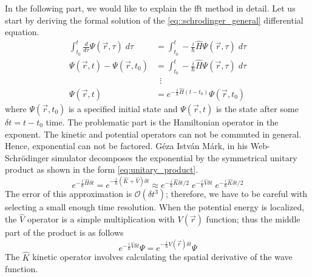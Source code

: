 In the following part, we would like to explain the \acrshort{fft} method in detail.
Let us start by deriving the formal solution of the \ref{eq::schrodinger_general} differential equation.
\begin{equation}
	\label{eq:formal_solution}
	\begin{split}
		\int_{t_0}^t \frac{d}{d\tau}\Psi(\vec{r}, \tau) \; d\tau &= \int_{t_0}^t -\frac{i}{\hbar}\hat{H}\Psi(\vec{r}, \tau)\; d\tau\\
		\Psi(\vec{r}, t) - \Psi(\vec{r}, t_0) &= \int_{t_0}^t -\frac{i}{\hbar}\hat{H}\Psi(\vec{r}, \tau)\; d\tau\\
		&\;\:\vdots\\
		\Psi(\vec{r}, t) &= e^{-\frac{i}{\hbar}\hat{H}(t - t_0)} \Psi(\vec{r}, t_0)
	\end{split}
\end{equation}
where $\Psi(\vec{r}, t_0)$ is a specified initial state and $\Psi(\vec{r}, t)$ is the state after some $\delta t = t - t_0$ time.
The problematic part is the Hamiltonian operator in the exponent.
The kinetic and potential operators can not be commuted in general. Hence, exponential can not be factored.
Géza István Márk, in his Web-Schrödinger simulator \cite{mark2020webschrodinger} decomposes the exponential by the symmetrical unitary product as shown in the form \ref{eq:unitary_product}.
\begin{equation}
	\label{eq:unitary_product}
	e^{-\frac{i}{\hbar}\hat{H}\delta t} = e^{-\frac{i}{\hbar}(\hat{K} + \hat{V})\delta t} \approx e^{-\frac{i}{\hbar}\hat{K}\delta t / 2}\; e^{-\frac{i}{\hbar}\hat{V}\delta t}\; e^{-\frac{i}{\hbar}\hat{K}\delta t / 2}
\end{equation}
The error of this approximation is $\mathcal{O}(\delta t^3)$; therefore, we have to be careful with selecting a small enough time resolution.
When the potential energy is localized, the $\hat{V}$ operator is a simple multiplication with $V(\vec{r})$ function; thus the middle part of the product is as follows
\begin{equation}
	\label{eq:potential_prop}
	e^{-\frac{i}{\hbar}\hat{V}\delta t} \Psi = e^{-\frac{i}{\hbar}V(\vec{r})\delta t} \Psi
\end{equation}
The $\hat{K}$ kinetic operator involves calculating the spatial derivative of the wave function.

